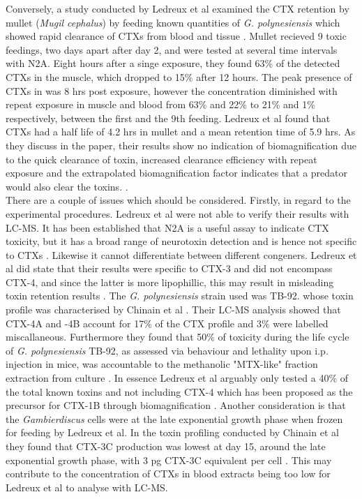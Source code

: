\documentclass[12pt]{article}
\begin{document}
Conversely, a study conducted by Ledreux et al examined the CTX retention by mullet (\emph{Mugil cephalus}) by feeding known quantities of \emph{G. polynesiensis} which showed rapid clearance of CTXs from blood and tissue \cite{ledreux2014dynamics}. 
Mullet recieved 9 toxic feedings, two days apart after day 2, and were tested at several time intervals with N2A. Eight hours after a singe exposure, they found 63\% of the detected CTXs in the muscle, which dropped to 15\% after 12 hours. The peak presence of CTXs in was 8 hrs post exposure, however the concentration diminished with repeat exposure in muscle and blood from 63\% and 22\% to 21\% and 1\% respectively, between the first and the 9th feeding. Ledreux et al found that CTXs had a half life of 4.2 hrs in mullet and a mean retention time of 5.9 hrs. As they discuss in the paper, their results show no indication of biomagnification due to the quick clearance of toxin, increased clearance efficiency with repeat exposure and the extrapolated biomagnification factor indicates that a predator would also clear the toxins.  \cite{ledreux2014dynamics}. \\
There are a couple of issues which should be considered. Firstly, in regard to the experimental procedures. Ledreux et al were not able to verify their results with LC-MS. It has been established that N2A is a useful assay to indicate CTX toxicity, but it has a broad range of neurotoxin detection and is  hence not specific to CTXs \cite{ebesu2012comment}. Likewise it cannot differentiate between different congeners. Ledreux et al did state that their results were specific to CTX-3 and did not encompass CTX-4, and since the latter is more lipophillic, this may result in misleading toxin retention results \cite{ledreux2014dynamics}. The \emph{G. polynesiensis} strain used was TB-92. whose toxin profile was characterised by Chinain et al \cite{chinain2010growth}. Their LC-MS analysis showed that CTX-4A and -4B account for 17\% of the CTX profile and 3\% were labelled miscallaneous. Furthermore they found that 50\% of toxicity during the life cycle of \emph{G. polynesiensis} TB-92, as assessed via behaviour and lethality upon i.p. injection in mice, was accountable to the methanolic "MTX-like" fraction extraction from culture \cite{chinain2010growth}. In essence Ledreux et al arguably only tested a 40\% of the total known toxins and not including CTX-4 which has been proposed as the precursor for CTX-1B through biomagnification \cite{murata1990structures}. Another consideration is that the \emph{Gambierdiscus} cells were at the late exponential growth phase when frozen for feeding by Ledreux et al. In the toxin profiling conducted by Chinain et al they found that CTX-3C production was lowest at day 15, around the late exponential growth phase, with 3 pg CTX-3C equivalent per cell \cite{chinain2010growth}. This may contribute to the concentration of CTXs in blood extracts being too low for Ledreux et al to analyse with LC-MS. \\
\end{document}
